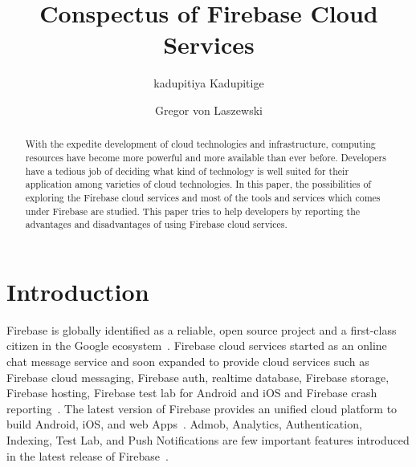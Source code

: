 
\title{Conspectus of Firebase Cloud Services}


\author{kadupitiya Kadupitige}

\author{Gregor von Laszewski}


\renewcommand{\shortauthors}{G. v. Laszewski}


\begin{abstract}
With the expedite development of cloud technologies and infrastructure,
computing resources have become more powerful and more available than ever
before. Developers have a tedious job of deciding what kind of technology is
well suited for their application among varieties of cloud technologies. In this
paper, the possibilities of exploring the Firebase cloud services and most of
the tools and services which comes under Firebase are studied. This paper tries
to help developers by reporting the advantages and disadvantages of using
Firebase cloud services.
\end{abstract}



\maketitle


\section{Introduction}

Firebase is globally identified as a reliable, open source project and a
first-class citizen in the Google ecosystem~\cite{hid-sp18-409-www-firebase}.
Firebase cloud services started as an online chat message service and soon
expanded to provide cloud services such as Firebase cloud messaging, Firebase
auth, realtime database, Firebase storage, Firebase hosting, Firebase test lab
for Android and iOS and Firebase crash
reporting~\cite{hid-sp18-409-www-firebase-official}. The latest version of
Firebase provides an unified cloud platform to build Android, iOS, and web
Apps~\cite{hid-sp18-409-www-firebase-official}.  Admob, Analytics,
Authentication, Indexing, Test Lab, and Push Notifications are few important
features introduced in the latest release of
Firebase~\cite{hid-sp18-409-www-firebase-official}.

